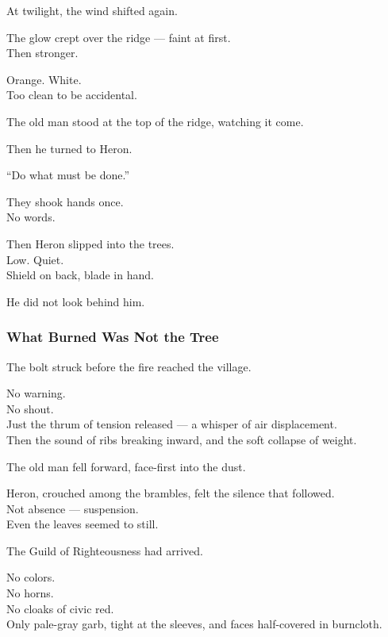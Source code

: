 \documentclass[12pt]{article}
\begin{document}
\vspace{1em}

At twilight, the wind shifted again.

The glow crept over the ridge — faint at first.\\
Then stronger.

Orange. White.\\
Too clean to be accidental.

The old man stood at the top of the ridge, watching it come.

Then he turned to Heron.

\vspace{1em}

“Do what must be done.”

\vspace{1em}

They shook hands once.\\
No words.

Then Heron slipped into the trees.\\
Low. Quiet.\\
Shield on back, blade in hand.

He did not look behind him.

\dotfill

\subsubsection{What Burned Was Not the Tree}

The bolt struck before the fire reached the village.

No warning.\\
No shout.\\
Just the thrum of tension released — a whisper of air displacement.\\
Then the sound of ribs breaking inward, and the soft collapse of weight.

The old man fell forward, face-first into the dust.

Heron, crouched among the brambles, felt the silence that followed.\\
Not absence — suspension.\\
Even the leaves seemed to still.

\vspace{1em}

The Guild of Righteousness had arrived.

No colors.\\
No horns.\\
No cloaks of civic red.\\
Only pale-gray garb, tight at the sleeves, and faces half-covered in burncloth.
\end{document}
